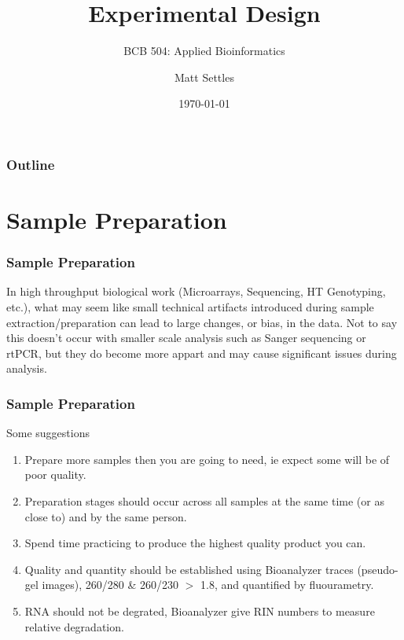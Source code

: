 \documentclass[pdf]{beamer}
\begin{document}
\title[Experimental Design]{Experimental Design}
\subtitle{BCB 504: Applied Bioinformatics\\}
\author[Matt Settles]{Matt Settles}
\date{\today}


\begin{frame}[plain]
  \titlepage
\end{frame}


\begin{frame}[plain] 
  \frametitle{Outline}
  \tableofcontents
\end{frame}

\section{Sample Preparation}
\begin{frame}
\frametitle{Sample Preparation}
In high throughput biological work (Microarrays, Sequencing, HT Genotyping, etc.), what may seem like small technical artifacts introduced during sample extraction/preparation can lead to large changes, or bias, in the data. Not to say this doesn't occur with smaller scale analysis such as Sanger sequencing or rtPCR, but they do become more appart and may cause significant issues during analysis.
\end{frame}


\begin{frame}
\frametitle{Sample Preparation}
Some suggestions
\begin{enumerate}
\item Prepare more samples then you are going to need, ie expect some will be of poor quality.
\item Preparation stages should occur across all samples at the same time (or as close to) and by the same person.
\item Spend time practicing to produce the highest quality product you can.
\item Quality and quantity should be established using Bioanalyzer traces (pseudo-gel images), 260/280 \& 260/230 $>$ 1.8, and quantified by fluourametry.  
\item RNA should not be degrated, Bioanalyzer give RIN numbers to measure relative degradation. 
\end{enumerate}
\end{frame}
\end{document}
